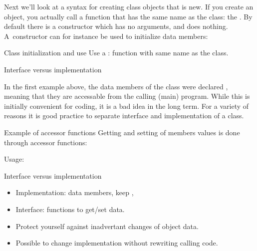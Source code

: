 Next we'll look at a syntax for creating class objects that is new. If
you create an object, you actually call a function that has the same
name as the class: the . By default there is a
constructor which has no arguments, and does nothing. A~constructor
can for instance be used to initialize data members:
%

\begin{slide}{Class initialization and use}
  \label{sl:class-construct}
  Use a : function with same name as the class.
\end{slide}

 {Interface versus implementation}

In the first example above, the data members of the  class were
declared , meaning that they are accessable from the calling
(main) program. While this is initially convenient for coding, it is a bad idea
in the long term. For a variety of reasons it is good practice to
separate interface and implementation of a class.

\begin{block}{Example of accessor functions}
  \label{sl:pointaccess}
  Getting and setting of members values is done through accessor functions:
  \begin{multicols}{2}
    Usage:
  \end{multicols}
\end{block}

\begin{block}{Interface versus implementation}
  \label{sl:interfaceimpl}
  \begin{itemize}
  \item Implementation: data members, keep ,
  \item Interface:  functions to get/set data.
  \item Protect yourself against inadvertant changes of object data.
  \item Possible to change implementation without rewriting calling code.
  \end{itemize}
\end{block}


